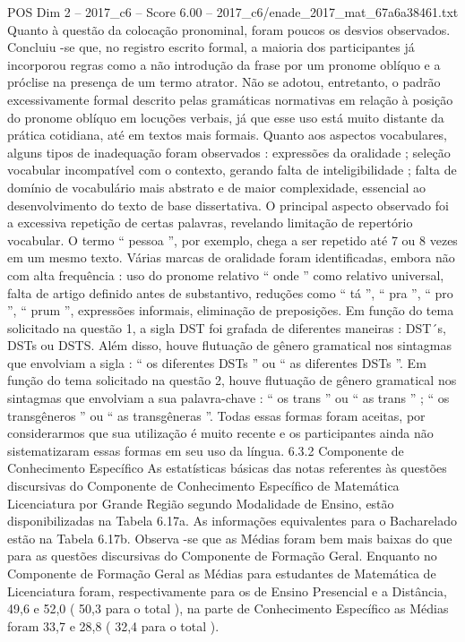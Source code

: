 \begin{textsample}{POS Dim 2 – 2017\_c6 – Score 6.00 – 2017\_c6/enade\_2017\_mat\_67a6a38461.txt}
Quanto à questão da colocação pronominal, foram poucos os desvios observados.
Concluiu -se que, no registro escrito formal, a maioria dos participantes já incorporou regras como a não introdução da frase por um pronome oblíquo e a próclise na presença de um termo atrator.
Não se adotou, entretanto, o padrão excessivamente formal descrito pelas gramáticas normativas em relação à posição do pronome oblíquo em locuções verbais, já que esse uso está muito distante da prática cotidiana, até em textos mais formais.
Quanto aos aspectos vocabulares, alguns tipos de inadequação foram observados : expressões da oralidade ; seleção vocabular incompatível com o contexto, gerando falta de inteligibilidade ; falta de domínio de vocabulário mais abstrato e de maior complexidade, essencial ao desenvolvimento do texto de base dissertativa.
O principal aspecto observado foi a excessiva repetição de certas palavras, revelando limitação de repertório vocabular.
O termo “ pessoa ”, por exemplo, chega a ser repetido até 7 ou 8 vezes em um mesmo texto.
Várias marcas de oralidade foram identificadas, embora não com alta frequência : uso do pronome relativo “ onde ” como relativo universal, falta de artigo definido antes de substantivo, reduções como “ tá ”, “ pra ”, “ pro ”, “ prum ”, expressões informais, eliminação de preposições.
Em função do tema solicitado na questão 1, a sigla DST foi grafada de diferentes maneiras : DST´s, DSTs ou DSTS.
Além disso, houve flutuação de gênero gramatical nos sintagmas que envolviam a sigla : “ os diferentes DSTs ” ou “ as diferentes DSTs ”.
Em função do tema solicitado na questão 2, houve flutuação de gênero gramatical nos sintagmas que envolviam a sua palavra-chave : “ os trans ” ou “ as trans ” ; “ os transgêneros ” ou “ as transgêneras ”.
Todas essas formas foram aceitas, por considerarmos que sua utilização é muito recente e os participantes ainda não sistematizaram essas formas em seu uso da língua. 6.3.2 Componente de Conhecimento Específico As estatísticas básicas das notas referentes às questões discursivas do Componente de Conhecimento Específico de Matemática Licenciatura por Grande Região segundo Modalidade de Ensino, estão disponibilizadas na Tabela 6.17a.
As informações equivalentes para o Bacharelado estão na Tabela 6.17b.
Observa -se que as Médias foram bem mais baixas do que para as questões discursivas do Componente de Formação Geral.
Enquanto no Componente de Formação Geral as Médias para estudantes de Matemática de Licenciatura foram, respectivamente para os de Ensino Presencial e a Distância, 49,6 e 52,0 ( 50,3 para o total ), na parte de Conhecimento Específico as Médias foram 33,7 e 28,8 ( 32,4 para o total ).

\end{textsample}
